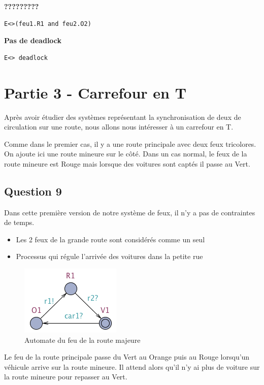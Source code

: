 \documentclass[11pt]{article}
\begin{document}
\textbf{?????????}
\begin{verbatim}
E<>(feu1.R1 and feu2.O2)
\end{verbatim}

\textbf{Pas de deadlock}
\begin{verbatim}
E<> deadlock
\end{verbatim}

\section{Partie 3 - Carrefour en T}
Après avoir étudier des systèmes représentant la synchronisation de deux de circulation sur une route, nous allons nous intéresser à un carrefour en T.

Comme dans le premier cas, il y a une route principale avec deux feux tricolores. On ajoute ici une route mineure sur le côté. Dans un cas normal, le feux de la route mineure est Rouge mais lorsque des voitures sont captés il passe au Vert.

\subsection{Question 9}

Dans cette première version de notre système de feux, il n'y a pas de contraintes de temps.

\begin{itemize}
	\item Les 2 feux de la grande route sont considérés comme un seul
	\item Processus qui régule l'arrivée des voitures dans la petite rue
\end{itemize}

\begin{figure}[H]
	\centering
	\includegraphics{ressources/part3/Q9-1.png}
	\caption{Automate du feu de la route majeure}
\end{figure}

Le feu de la route principale passe du Vert au Orange puis au Rouge lorsqu'un véhicule arrive sur la route mineure. Il attend alors qu'il n'y ai plus de voiture sur la route mineure pour repasser au Vert.
\end{document}

